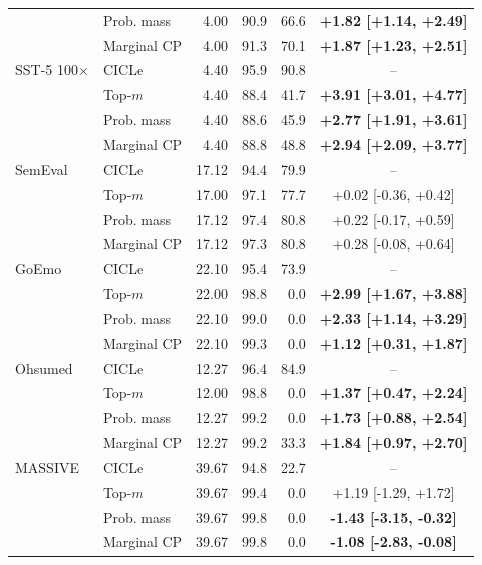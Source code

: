 \begin{tabular}{llrrrc}
 & Prob. mass & 4.00 & 90.9 & 66.6 & \textbf{+1.82 [+1.14, +2.49]} \\
 & Marginal CP & 4.00 & 91.3 & 70.1 & \textbf{+1.87 [+1.23, +2.51]} \\
\addlinespace
SST-5 100$\times$ & CICLe & 4.40 & 95.9 & 90.8 & -- \\
 & Top-$m$ & 4.40 & 88.4 & 41.7 & \textbf{+3.91 [+3.01, +4.77]} \\
 & Prob. mass & 4.40 & 88.6 & 45.9 & \textbf{+2.77 [+1.91, +3.61]} \\
 & Marginal CP & 4.40 & 88.8 & 48.8 & \textbf{+2.94 [+2.09, +3.77]} \\
\addlinespace
SemEval & CICLe & 17.12 & 94.4 & 79.9 & -- \\
 & Top-$m$ & 17.00 & 97.1 & 77.7 & +0.02 [-0.36, +0.42] \\
 & Prob. mass & 17.12 & 97.4 & 80.8 & +0.22 [-0.17, +0.59] \\
 & Marginal CP & 17.12 & 97.3 & 80.8 & +0.28 [-0.08, +0.64] \\
\addlinespace
GoEmo & CICLe & 22.10 & 95.4 & 73.9 & -- \\
 & Top-$m$ & 22.00 & 98.8 & 0.0 & \textbf{+2.99 [+1.67, +3.88]} \\
 & Prob. mass & 22.10 & 99.0 & 0.0 & \textbf{+2.33 [+1.14, +3.29]} \\
 & Marginal CP & 22.10 & 99.3 & 0.0 & \textbf{+1.12 [+0.31, +1.87]} \\
\addlinespace
Ohsumed & CICLe & 12.27 & 96.4 & 84.9 & -- \\
 & Top-$m$ & 12.00 & 98.8 & 0.0 & \textbf{+1.37 [+0.47, +2.24]} \\
 & Prob. mass & 12.27 & 99.2 & 0.0 & \textbf{+1.73 [+0.88, +2.54]} \\
 & Marginal CP & 12.27 & 99.2 & 33.3 & \textbf{+1.84 [+0.97, +2.70]} \\
\addlinespace
MASSIVE & CICLe & 39.67 & 94.8 & 22.7 & -- \\
 & Top-$m$ & 39.67 & 99.4 & 0.0 & +1.19 [-1.29, +1.72] \\
 & Prob. mass & 39.67 & 99.8 & 0.0 & \textbf{-1.43 [-3.15, -0.32]} \\
 & Marginal CP & 39.67 & 99.8 & 0.0 & \textbf{-1.08 [-2.83, -0.08]} \\
\bottomrule
\end{tabular}
